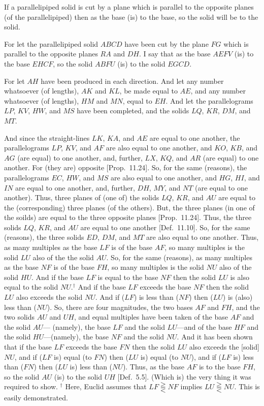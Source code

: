 If a parallelipiped solid is cut by a plane which is 
parallel to the opposite planes (of the parallelipiped) then as the base (is) to
the base, so the solid will be to the solid.\\

\epsfysize=1.6in
\centerline{}

For let the parallelipiped solid $ABCD$ have been cut by the
plane $FG$ which is parallel to the opposite planes $RA$ and $DH$.
I say that as the base $AEFV$ (is) to the base $EHCF$, so the solid
$ABFU$ (is) to the solid $EGCD$.

For let $AH$ have been produced in each direction. And let any number whatsoever (of lengths), $AK$ and $KL$, be made equal to $AE$,
and any number whatsoever (of lengths), $HM$ and $MN$, equal to $EH$.
And let the parallelograms $LP$, $KV$, $HW$, and $MS$ have been completed, and the solids $LQ$, $KR$, $DM$, and $MT$.

And since the straight-lines $LK$, $KA$, and $AE$ are equal to one another,
the parallelograms $LP$, $KV$, and $AF$ are also equal to
one another, and $KO$, $KB$, and $AG$ (are equal) to one another, and,
further, $LX$, $KQ$, and $AR$ (are equal) to one another. For (they
are) opposite [Prop.~11.24]. So, for the
same (reasons), the parallelograms $EC$, $HW$, and $MS$
are also equal to one another, and $HG$, $HI$, and $IN$ are equal to
one another, and, further, $DH$, $MY$, and $NT$ (are equal to one another).
Thus, three planes of (one of) the solids $LQ$, $KR$, and $AU$ are equal to
the (corresponding) three planes (of the others). But, the three planes
(in one of the soilds) are equal to the three opposite planes [Prop.~11.24]. Thus, the three solids $LQ$,
$KR$, and $AU$ are equal to one another [Def.~11.10]. So, for the same (reasons), the
three solids $ED$, $DM$, and $MT$ are also equal to one another.
Thus, as many multiples as the base $LF$ is of the base $AF$, so many
multiples is the solid $LU$ also of the the solid $AU$. So, for the same (reasons), 
as many multiples as the base $NF$ is of the base $FH$, so many
multiples is the solid $NU$ also of the solid $HU$. And if the base
$LF$ is equal to the base $NF$ then the solid $LU$ is also
equal to the solid $NU$.$^\dag$ And if the base $LF$  exceeds the base $NF$
then the solid $LU$ also exceeds the solid $NU$. And if ($LF$) is less than ($NF$) then ($LU$) is (also) less than ($NU$). So, there are four magnitudes, the
two bases $AF$ and $FH$, and the two solids $AU$ and $UH$, and
equal multiples have been taken of the base $AF$ and the solid $AU$--- (namely), the base $LF$ and the solid $LU$---and of the base
$HF$ and the solid $HU$---(namely), the base $NF$ and the solid $NU$.
And it has been shown that if the base $LF$ exceeds the base $FN$ then the
solid $LU$ also exceeds the [solid] $NU$, and if ($LF$ is) equal (to $FN$) then
($LU$ is) equal (to $NU$), and if ($LF$ is) less than ($FN$) then 
($LU$ is) less than ($NU$). Thus, as the base $AF$ is to the base
$FH$, so the solid $AU$ (is) to the solid $UH$ [Def.~5.5]. (Which is) the very thing it was required to show.
{\footnotesize\noindent$^\dag$ Here, Euclid assumes that $LF\gtreqqless NF$ implies $LU \gtreqqless NU$. This is easily demonstrated.}

